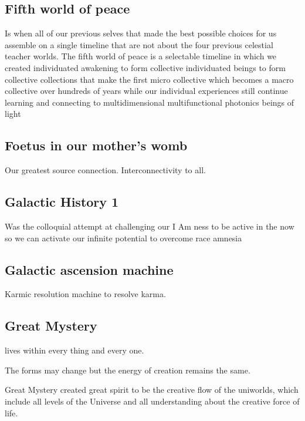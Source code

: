 \subsection{Fifth world of peace}\label{fifth-world-of-peace}

Is when all of our previous selves that made the best possible choices
for us assemble on a single timeline that are not about the four
previous celestial teacher worlds. The fifth world of peace is a
selectable timeline in which we created individuated awakening to form
collective individuated beings to form collective collections that make
the first micro collective which becomes a macro collective over
hundreds of years while our individual experiences still continue
learning and connecting to multidimensional multifunctional photonics
beings of light

\subsection{Foetus in our mother's
womb}\label{foetus-in-our-mothers-womb}

Our greatest source connection. Interconnectivity to all.

\subsection{Galactic History 1}\label{galactic-history-1}

Was the colloquial attempt at challenging our I Am ness to be active in
the now so we can activate our infinite potential to overcome race
amnesia

\subsection{Galactic ascension
machine}\label{galactic-ascension-machine}

Karmic resolution machine to resolve karma.

\subsection{Great Mystery}\label{great-mystery}

lives within every thing and every one.

The forms may change but the energy of creation remains the same.

Great Mystery created great spirit to be the creative flow of the
uniworlds, which include all levels of the Universe and all
understanding about the creative force of life.

